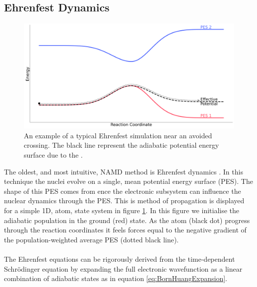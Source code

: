 \subsection{Ehrenfest Dynamics}
\begin{figure}[htp]
  \includegraphics[width=\textwidth]{../img/Eh_hop.png}
	\caption{\label{fig:Eh_diag}An example of a typical Ehrenfest simulation near an avoided crossing. The black line represent the adiabatic potential energy surface due to the .  }
\end{figure}
\noindent The oldest, and most intuitive, NAMD method is Ehrenfest dynamics \cite{Ehrenfest1927}. In this technique the nuclei evolve on a single, mean potential energy surface (PES). The shape of this PES comes from ence the electronic subsystem can influence the nuclear dynamics through the PES. This is method of propagation is displayed for a simple 1D,  atom,  state system in figure \ref{fig:Eh_diag}. In this figure we initialise the adiabatic population in the ground (red) state. As the atom (black dot) progress through the reaction coordinates it feels forces equal to the negative gradient of the population-weighted average PES (dotted black line).
\\\\
The Ehrenfest equations can be rigorously derived from the time-dependent Schr\"odinger equation by expanding the full electronic wavefunction as a linear combination of adiabatic states as in equation \eqref{eq:BornHuangExpansion}.
